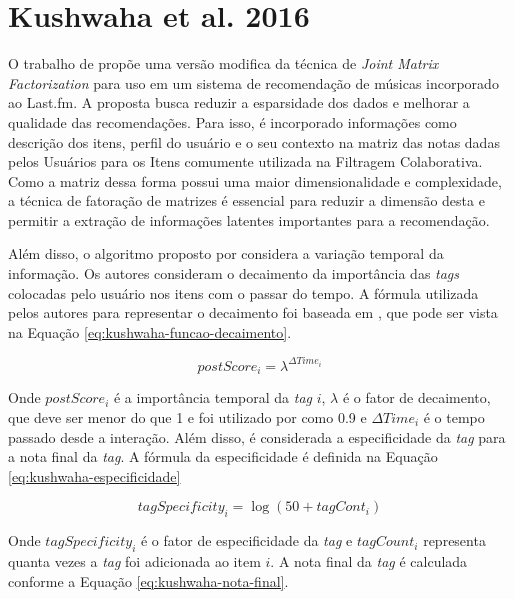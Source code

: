 \section{Kushwaha et al. 2016}

O trabalho de  propõe uma versão modifica da técnica de \textit{Joint Matrix Factorization}
para uso em um sistema de recomendação de músicas incorporado ao Last.fm. A proposta busca reduzir a esparsidade dos
dados e melhorar a qualidade das recomendações. Para isso, é incorporado informações como descrição dos itens, perfil
do usuário e o seu contexto na matriz das notas dadas pelos Usuários para os Itens comumente utilizada na Filtragem
Colaborativa. Como a matriz dessa forma possui uma maior dimensionalidade e complexidade, a técnica de fatoração de
matrizes é essencial para reduzir a dimensão desta e permitir a extração de informações latentes importantes para a
recomendação.

Além disso, o algoritmo proposto por  considera a variação temporal da informação.
Os autores consideram o decaimento da importância das \textit{tags} colocadas pelo usuário nos itens com o passar do tempo. A
fórmula utilizada pelos autores para representar o decaimento foi baseada em , que pode ser
vista na Equação \ref{eq:kushwaha-funcao-decaimento}.

\begin{equation}
  \label{eq:kushwaha-funcao-decaimento}
  postScore_i = \lambda^{\Delta Time_i}
\end{equation}

Onde $postScore_i$ é a importância temporal da \textit{tag} $i$, $\lambda$ é o fator de decaimento, que deve ser menor do que 1
e foi utilizado por  como 0.9 e $\Delta Time_i$ é o tempo passado desde a interação. Além disso,
é considerada a especificidade da \textit{tag} para a nota final da \textit{tag}. A fórmula da especificidade é definida
na Equação \ref{eq:kushwaha-especificidade}

\begin{equation}
  \label{eq:kushwaha-especificidade}
  tagSpecificity_i = \log(50+tagCont_i)
\end{equation}

Onde $tagSpecificity_i$ é o fator de especificidade da \textit{tag} e $tagCount_i$ representa quanta vezes a \textit{tag} foi adicionada
ao item $i$. A nota final da \textit{tag} é calculada conforme a Equação \ref{eq:kushwaha-nota-final}.

